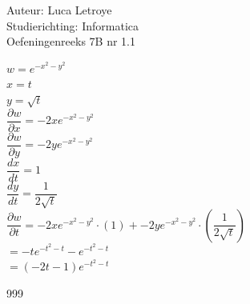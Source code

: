 \documentclass[a4paper]{article}
\begin{document}
  
\noindent \large Auteur: Luca Letroye \\
\noindent \large Studierichting: Informatica\\
\noindent \large Oefeningenreeks 7B nr 1.1\\

\medskip

\normalsize

$w = e^{-x^2-y^2}$\\

$x= t$\\

$y = \sqrt{t}$\\

$\dfrac{\partial w}{\partial x} = -2xe^{-x^2-y^2}$\\

$\dfrac{\partial w}{\partial y} = -2ye^{-x^2-y^2}$\\

$\dfrac{dx}{dt} = 1$\\

$\dfrac{dy}{dt} = \dfrac{1}{2\sqrt{t}}$\\

$\dfrac{\partial w}{\partial t} = -2xe^{-x^2-y^2}\cdot (1) + -2ye^{-x^2-y^2}\cdot \left(\dfrac{1}{2\sqrt{t}}\right)$\\

$ = -te^{-t^2-t} - e^{-t^2-t}$\\

$ = (-2t-1)e^{-t^2-t}$\\



\begin{thebibliography}{999}
\end{thebibliography}
\end{document}
